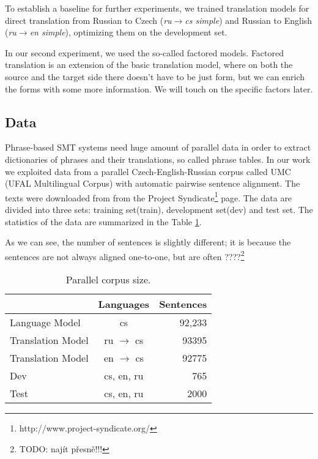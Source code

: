 \documentclass[11pt,letterpaper]{article}
\begin{document}
To establish a baseline for further experiments, we trained translation models for direct translation
from Russian to Czech
(\emph{ru$\rightarrow$cs simple}) and Russian to English (\emph{ru$\rightarrow$en simple}), %
optimizing them on the development set.

In our second experiment, we used the so-called factored models. Factored translation is an extension of the basic translation model, where on both the source and the target side there doesn't have to be just form, but we can enrich the forms with some more information. We will touch on the specific factors later.



\subsection{Data}
Phrase-based SMT systems need huge amount of parallel data in order to
extract dictionaries of phrases and their translations, so called phrase tables.
In our work we exploited data from a parallel Czech-English-Russian
corpus called UMC (UFAL Multilingual Corpus) with automatic pairwise sentence
alignment. The texts were downloaded from from the Project
Syndicate\footnote{http://www.project-syndicate.org/} page. 
The data are divided into three sets: training set(train),
development set(dev) and test set.
The statistics of the data are summarized in the Table \ref{tab:corpus}.

As we can see, the number of sentences is slightly different; it is because the sentences are not always aligned one-to-one, but are often ????\footnote{TODO: najít přesně!!!}
\begin{table}

\begin{center}
\begin{tabular}{lcr}
  &  Languages & Sentences \\
\hline
Language Model & cs & 92,233 \\
Translation Model & ru $\rightarrow$ cs &  93395\\
Translation Model & en $\rightarrow$ cs &  92775\\ \hline %
Dev     & cs, en, ru          &    765 \\
Test     & cs, en, ru          &  2000 \\
\hline
\end{tabular}
\end{center}
\caption{Parallel corpus size.}
\label{tab:corpus}
\end{table}
\end{document}
